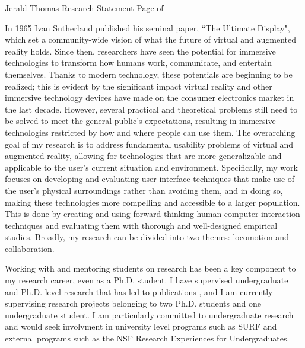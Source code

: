 \newpage

\setcounter{page}{1}
\makecvfooter
  {Jerald Thomas}
  {Research Statement}
  {Page \thepage \hspace{1pt} of \pageref{research_last}}


\makecvheader[C]
\doublespacing


In 1965 Ivan Sutherland published his seminal paper, ``The Ultimate Display", which set a community-wide vision of what the future of virtual and augmented reality holds. Since then, researchers have seen the potential for immersive technologies to transform how humans work, communicate, and entertain themselves. Thanks to modern technology, these potentials are beginning to be realized; this is evident by the significant impact virtual reality and other immersive technology devices have made on the consumer electronics market in the last decade. However, several practical and theoretical problems still need to be solved to meet the general public’s expectations, resulting in immersive technologies restricted by how and where people can use them. The overarching goal of my research is to address fundamental usability problems of virtual and augmented reality, allowing for technologies that are more generalizable and applicable to the user's current situation and environment. Specifically, my work focuses on developing and evaluating user interface techniques that make use of the user's physical surroundings rather than avoiding them, and in doing so, making these technologies more compelling and accessible to a larger population. This is done by creating and using forward-thinking human-computer interaction techniques and evaluating them with thorough and well-designed empirical studies. Broadly, my research can be divided into two themes: locomotion and collaboration.

Working with and mentoring students on research has been a key component to my research career, even as a Ph.D. student. I have supervised undergraduate and Ph.D. level research that has led to publications \cite{you2019strafing, adeniyi2021red, you2022strafing}, and I am currently supervising research projects belonging to two Ph.D. students and one undergraduate student. I am particularly committed to undergraduate research and would seek involvment in university level programs such as SURF and external programs such as the NSF Research Experiences for Undergraduates.

